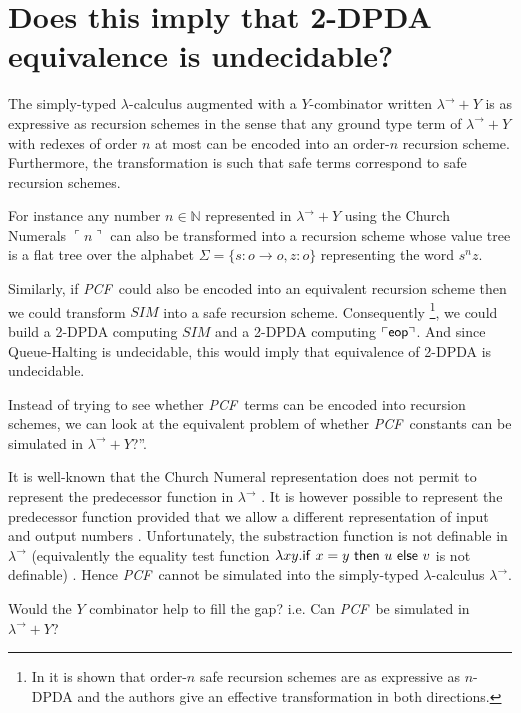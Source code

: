 \documentclass{article}
\newcommand\nat{\mathbb{N}}
\newcommand\eop{{\sf eop}}
\newcommand{\encode}[1]{\ulcorner #1 \urcorner}
\newcommand\pcf{\textsl{PCF}}
\begin{document}
\section{Does this imply that 2-DPDA equivalence is undecidable?}

The simply-typed $\lambda$-calculus augmented with a $Y$-combinator written $\lambda^\rightarrow + Y$ is as expressive as recursion schemes in the sense that any ground type term of $\lambda^\rightarrow + Y$ with redexes of order $n$ at most can be encoded into an order-$n$ recursion scheme. Furthermore, the transformation is such that safe terms correspond to safe recursion schemes.

For instance any number $n \in \nat$ represented in $\lambda^\rightarrow + Y$ using the Church Numerals $\encode{n}$ can also be transformed into a recursion scheme whose value tree is a flat tree over the alphabet $\Sigma = \{s:o\rightarrow o, z:o\}$ representing the word $s^n z$. 


Similarly, if \pcf\ could also be encoded into an equivalent recursion scheme then we could transform $SIM$ into a safe recursion scheme. Consequently \footnote{In \cite{KNU02} it is shown that order-$n$ safe recursion schemes are as expressive as $n$-DPDA and the authors give an effective transformation in both directions.}, we could build a 2-DPDA computing $SIM$ and a 2-DPDA computing $\encode{\eop}$. And since Queue-Halting is undecidable, this would imply that equivalence of 2-DPDA is undecidable.

Instead of trying to see whether \pcf\ terms can be encoded into recursion schemes, we can look at the equivalent problem of whether \pcf\ constants can be simulated in $\lambda^\rightarrow + Y$?''.

It is well-known that the Church Numeral representation does not permit
to represent the predecessor function in $\lambda^\rightarrow$ \cite{DBLP:journals/jacm/FortuneLO83}. It is however possible to represent the predecessor function provided that we allow a different representation of input and output numbers \cite{DBLP:journals/jacm/FortuneLO83}.
Unfortunately, the substraction function is not definable in $\lambda^\rightarrow$ (equivalently  the equality test function $\lambda xy. {\sf if\ } x = y {\sf\ then\ } u {\sf\ else\ } v$ is not definable) \cite{DBLP:journals/jacm/FortuneLO83}.
Hence \pcf\ cannot be simulated into the simply-typed $\lambda$-calculus $\lambda^\rightarrow$.

Would the $Y$ combinator help to fill the gap? i.e. Can \pcf\ be simulated in  $\lambda^\rightarrow + Y$?  
\end{document}
